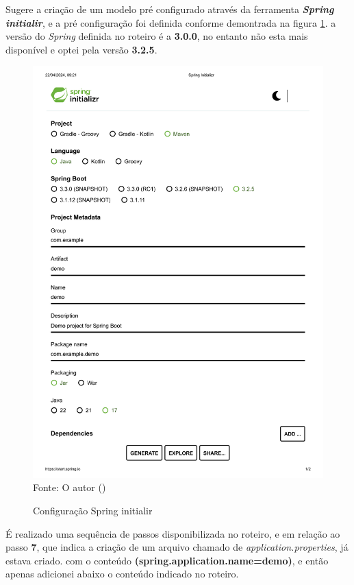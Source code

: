 \par Sugere a criação de um modelo pré configurado através da ferramenta \textit{\textbf{Spring initialir}}, e a pré configuração foi definida conforme demontrada na figura \ref{fig:spring}. a versão do \textit{Spring} definida no roteiro é a \textbf{3.0.0}, no entanto não esta mais disponível e optei pela versão \textbf{3.2.5}.


\begin{figure}[H]
\center
  \caption{Configuração Spring initialir}
  \includegraphics[scale=0.6]{figure/Spring Initializr.pdf}
  \label{fig:spring}
  \flushleft %
    {\fontsize{10pt}{\baselineskip}\selectfont
    Fonte: O autor (\the\year) }
\end{figure}


\par É realizado uma sequência de passos disponibilizada no roteiro, e em relação ao passo \textbf{7}, que indica a criação de um arquivo chamado de \textit{application.properties}, já estava criado. com o conteúdo \textbf{(spring.application.name=demo)}, e então apenas adicionei abaixo o conteúdo indicado no roteiro.



